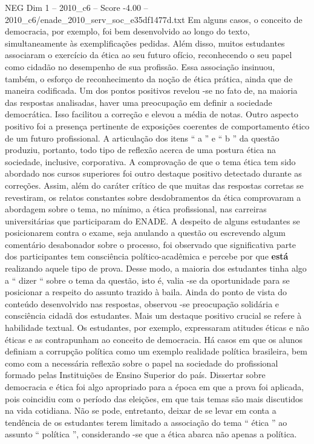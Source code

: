 \begin{textsample}{NEG Dim 1 – 2010\_c6 – Score -4.00 – 2010\_c6/enade\_2010\_serv\_soc\_e35df1477d.txt}
Em alguns casos, o conceito de democracia, por exemplo, foi bem desenvolvido ao longo do texto, simultaneamente às exemplificações pedidas.
Além disso, muitos estudantes associaram o exercício da ética ao seu futuro ofício, reconhecendo o seu papel como cidadão no desempenho de sua profissão.
Essa associação insinuou, também, o esforço de reconhecimento da noção de ética prática, ainda que de maneira codificada.
Um dos pontos positivos revelou -se no fato de, na maioria das respostas analisadas, haver uma preocupação em definir a sociedade democrática.
Isso facilitou a correção e elevou a média de notas.
Outro aspecto positivo foi a presença pertinente de exposições coerentes de comportamento ético de um futuro profissional.
A articulação dos itens “ a ” e “ b ” da questão produziu, portanto, todo tipo de reflexão acerca de uma postura ética na sociedade, inclusive, corporativa.
A comprovação de que o tema ética tem sido abordado nos cursos superiores foi outro destaque positivo detectado durante as correções.
Assim, além do caráter crítico de que muitas das respostas corretas se revestiram, os relatos constantes sobre desdobramentos da ética comprovaram a abordagem sobre o tema, no mínimo, a ética profissional, nas carreiras universitárias que participaram do ENADE.
A despeito de alguns estudantes se posicionarem contra o exame, seja anulando a questão ou escrevendo algum comentário desabonador sobre o processo, foi observado que significativa parte dos participantes tem consciência político-acadêmica e percebe por que \textbf{está} realizando aquele tipo de prova.
Desse modo, a maioria dos estudantes tinha algo a “ dizer “ sobre o tema da questão, isto é, valia -se da oportunidade para se posicionar a respeito do assunto trazido à baila.
Ainda do ponto de vista do conteúdo desenvolvido nas respostas, observou -se preocupação solidária e consciência cidadã dos estudantes.
Mais um destaque positivo crucial se refere à habilidade textual.
Os estudantes, por exemplo, expressaram atitudes éticas e não éticas e as contrapunham ao conceito de democracia.
Há casos em que os alunos definiam a corrupção política como um exemplo realidade política brasileira, bem como com a necessária reflexão sobre o papel na sociedade do profissional formado pelas Instituições de Ensino Superior do país.
Dissertar sobre democracia e ética foi algo apropriado para a época em que a prova foi aplicada, pois coincidiu com o período das eleições, em que tais temas são mais discutidos na vida cotidiana.
Não se pode, entretanto, deixar de se levar em conta a tendência de os estudantes terem limitado a associação do tema “ ética ” ao assunto “ política ”, considerando -se que a ética abarca não apenas a política.

\end{textsample}
